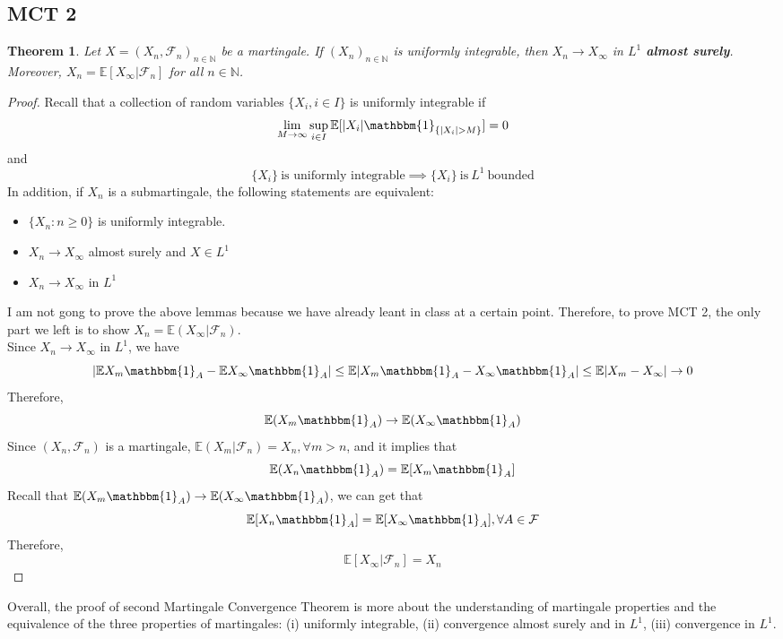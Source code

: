 \documentclass[10pt]{article}
\newtheorem{theorem}{Theorem}
\begin{document}
\subsection{MCT 2}
\begin{theorem}
Let $X=(X_n, \mathcal{F}_n)_{n \in \mathbb{N}}$ be a martingale. If $(X_n)_{n \in \mathbb{N}}$ is uniformly integrable, then $X_n \to X_{\infty}$ in $L^1$ \textbf{almost surely}. Moreover, $X_n=\mathbb{E}[X_{\infty}|\mathcal{F}_n]$ for all $n \in \mathbb{N}$.
\end{theorem}
\begin{proof}
Recall that a collection of random variables $\{X_i,  i \in I\}$ is uniformly integrable if $$\lim_{M \to \infty}\sup_{i \in I}\mathbb{E}[|X_i|\mathbbm{1}_{\{|X_i|>M\}}]=0$$ and $$\{X_i\}\ \text{is uniformly integrable} \implies \{X_i\} \ \text{is} \ L^1 \ \text{bounded}$$ In addition, if $X_n$  is a submartingale,
the following statements are equivalent:
\begin{itemize}
    \item $\{X_n : n\ge 0\}$ is uniformly integrable.
    \item $X_n \to X_{\infty}$ almost surely and $X \in L^1$
    \item $X_n \to X_{\infty}$ in $L^1$
\end{itemize}
I am not gong to prove the above lemmas because we have already leant in class at a certain point.
Therefore, to prove MCT 2, the only part we left is to show $X_n=\mathbb{E}(X_{\infty}|\mathcal{F}_n)$.\\
Since $X_n \to X_{\infty}$ in $L^1$, we have $$|\mathbb{E}X_m \mathbbm{1}_A-\mathbb{E}X_{\infty} \mathbbm{1}_A|\le \mathbb{E}|X_m\mathbbm{1}_A-X_{\infty}\mathbbm{1}_A|\le \mathbb{E}|X_m-X_{\infty}|\to 0$$Therefore, $$\mathbb{E}(X_m \mathbbm{1}_A) \to \mathbb{E}( X_{\infty}\mathbbm{1}_A)$$ Since $(X_n,\mathcal{F}_n)$ is a martingale, $\mathbb{E}(X_m|\mathcal{F}_n)=X_n, \forall m>n$, and it implies that $$\mathbb{E}(X_n \mathbbm{1}_A)=\mathbb{E}[X_m\mathbbm{1}_{A}]$$
Recall that $\mathbb{E}(X_m \mathbbm{1}_A) \to \mathbb{E}( X_{\infty}\mathbbm{1}_A)$, we can get that $$\mathbb{E}[X_n\mathbbm{1}_A]=\mathbb{E}[X_{\infty}\mathbbm{1}_A], \forall A\in \mathcal{F}$$ Therefore,  $$\mathbb{E}[{X_{\infty}|\mathcal{F}_n}]=X_n$$
\end{proof}
Overall, the proof of second Martingale Convergence Theorem is more about the understanding of martingale properties and the equivalence of the three properties of martingales: (i) uniformly integrable, (ii) convergence almost surely and in $L^1$, (iii) convergence in $L^1$.  
\end{document}
